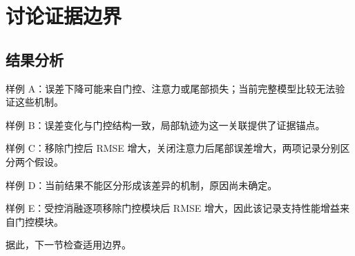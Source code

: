 \chapter{讨论证据边界}
\section{结果分析}
样例 A：误差下降可能来自门控、注意力或尾部损失；当前完整模型比较无法验证这些机制。

样例 B：误差变化与门控结构一致，局部轨迹为这一关联提供了证据锚点。

样例 C：移除门控后 RMSE 增大，关闭注意力后尾部误差增大，两项记录分别区分两个假设。

样例 D：当前结果不能区分形成该差异的机制，原因尚未确定。

样例 E：受控消融逐项移除门控模块后 RMSE 增大，因此该记录支持性能增益来自门控模块。

据此，下一节检查适用边界。
